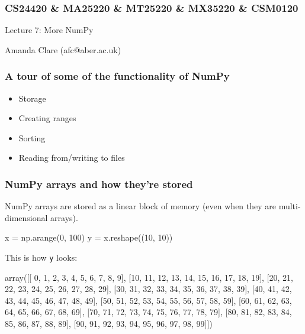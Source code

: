 \documentclass{beamer}
\begin{document}

\begin{frame}
\frametitle{CS24420 \& MA25220 \& MT25220 \& MX35220 \& CSM0120}

\begin{center}
\begin{huge}
Lecture 7: More NumPy
\end{huge}
\bigskip

Amanda Clare (afc@aber.ac.uk)

\end{center}
\end{frame}


\begin{frame}[fragile]
\frametitle{A tour of some of the functionality of NumPy}
\begin{itemize}
\item Storage
\item Creating ranges
\item Sorting
\item Reading from/writing to files
\end{itemize}
\end{frame}



\begin{frame}[fragile]
\frametitle{NumPy arrays and how they're stored}
NumPy arrays are stored as a linear block of memory (even when they
are multi-dimensional arrays).
\begin{code}
x = np.arange(0, 100)
y = x.reshape((10, 10))
\end{code}
This is how \texttt{y} looks:
\begin{code}
array([[ 0,  1,  2,  3,  4,  5,  6,  7,  8,  9],
       [10, 11, 12, 13, 14, 15, 16, 17, 18, 19],
       [20, 21, 22, 23, 24, 25, 26, 27, 28, 29],
       [30, 31, 32, 33, 34, 35, 36, 37, 38, 39],
       [40, 41, 42, 43, 44, 45, 46, 47, 48, 49],
       [50, 51, 52, 53, 54, 55, 56, 57, 58, 59],
       [60, 61, 62, 63, 64, 65, 66, 67, 68, 69],
       [70, 71, 72, 73, 74, 75, 76, 77, 78, 79],
       [80, 81, 82, 83, 84, 85, 86, 87, 88, 89],
       [90, 91, 92, 93, 94, 95, 96, 97, 98, 99]])
\end{code}
\end{frame}
\end{document}
